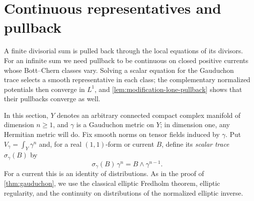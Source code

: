\section{Continuous representatives and pullback}
\label{sec:continuous-bc-representatives}

A finite divisorial sum is pulled back through the local equations of its divisors. For an infinite sum we need pullback to be continuous on closed positive currents whose Bott--Chern classes vary. Solving a scalar equation for the Gauduchon trace selects a smooth representative in each class; the complementary normalized potentials then converge in $L^1$, and \cref{lem:modification-lone-pullback} shows that their pullbacks converge as well.

In this section, $Y$ denotes an arbitrary connected compact complex manifold of dimension $n\geq1$, and $\gamma$ is a Gauduchon metric on $Y$; in dimension one, any Hermitian metric will do. Fix smooth norms on tensor fields induced by $\gamma$. Put $V_\gamma=\int_Y\gamma^n$ and, for a real $(1,1)$-form or current $B$, define its \emph{scalar trace} $\sigma_\gamma(B)$ by
\[
 \sigma_\gamma(B)\,\gamma^n=B\wedge\gamma^{n-1}.
\]
For a current this is an identity of distributions. As in the proof of \cref{thm:gauduchon}, we use the classical elliptic Fredholm theorem, elliptic regularity, and the continuity on distributions of the normalized elliptic inverse.

